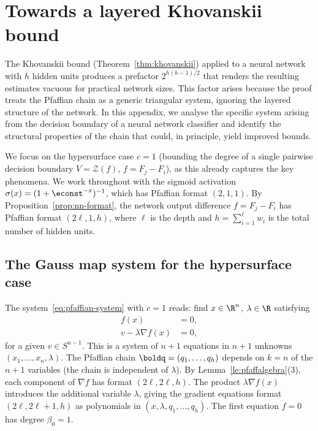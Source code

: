 
\section{Towards a layered Khovanskii bound}\label{app:layered}

The Khovanskii bound (Theorem~\ref{thm:khovanskii}) applied to a neural network with $h$ hidden units produces a prefactor $2^{h(h-1)/2}$ that renders the resulting estimates vacuous for practical network sizes. This factor arises because the proof treats the Pfaffian chain as a generic triangular system, ignoring the layered structure of the network. In this appendix, we analyse the specific system arising from the decision boundary of a neural network classifier and identify the structural properties of the chain that could, in principle, yield improved bounds.

We focus on the hypersurface case $c=1$ (bounding the degree of a single pairwise decision boundary $V = \mathcal{Z}(f)$, $f = F_j - F_i$), as this already captures the key phenomena. We work throughout with the sigmoid activation $\sigma(x) = (1+\econst^{-x})^{-1}$, which has Pfaffian format $(2,1,1)$. By Proposition~\ref{prop:nn-format}, the network output difference $f = F_j - F_i$ has Pfaffian format $(2\ell, 1, h)$, where $\ell$ is the depth and $h = \sum_{i=1}^{\ell} w_i$ is the total number of hidden units.

\subsection{The Gauss map system for the hypersurface case}

The system~\eqref{eq:pfaffian-system} with $c = 1$ reads: find $x \in \R^n$, $\lambda \in \R$ satisfying
\begin{equation}\label{eq:gauss-system-c1}
\begin{split}
  f(x) &= 0,\\
  v - \lambda \nabla f(x) &= 0,
\end{split}
\end{equation}
for a given $v \in S^{n-1}$. This is a system of $n+1$ equations in $n+1$ unknowns $(x_1, \ldots, x_n, \lambda)$. The Pfaffian chain $\boldq = (q_1, \ldots, q_h)$ depends on $k = n$ of the $n+1$ variables (the chain is independent of $\lambda$). By Lemma~\ref{le:pfaffalgebra}(3), each component of $\nabla f$ has format $(2\ell, 2\ell, h)$. The product $\lambda \nabla f(x)$ introduces the additional variable $\lambda$, giving the gradient equations format $(2\ell, 2\ell+1, h)$ as polynomials in $(x, \lambda, q_1, \ldots, q_h)$. The first equation $f = 0$ has degree $\beta_0 = 1$.

